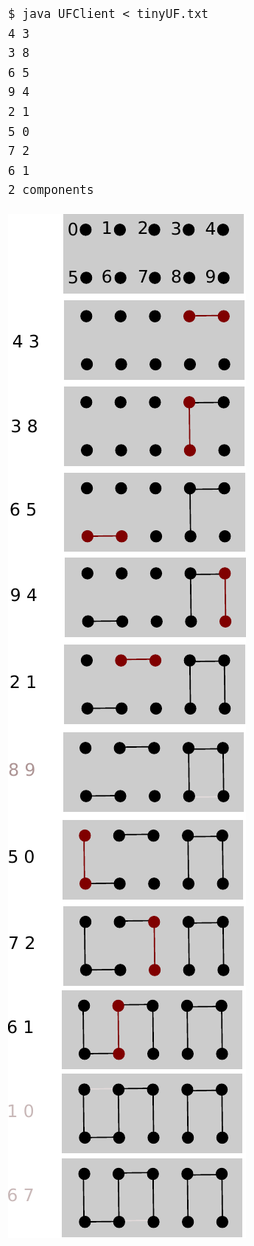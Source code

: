 \documentclass[8pt,a4paper,compress]{beamer}
\begin{document}
\begin{frame}[fragile]
\begin{minipage}{250pt}
\begin{lstlisting}[language={}]
$ java UFClient < tinyUF.txt 
4 3
3 8
6 5
9 4
2 1
5 0
7 2
6 1
2 components
\end{lstlisting}
\end{minipage}%
\begin{minipage}{60pt}
\hfill \includegraphics[scale=0.35]{./figures/dyn_conn.pdf}
\end{minipage}
\end{frame}
\end{document}
